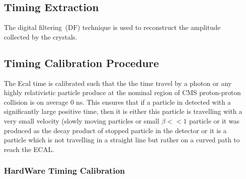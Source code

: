 
\subsection{Timing Extraction}
The digital  filtering~(DF) technique is used to reconstruct the amplitude collected by the \pb crystals.

\subsection{Timing Calibration Procedure}
The Ecal time is calibrated such that the the time travel by a photon or any highly relativistic  particle  produce at the nominal region of CMS proton-proton collision is on average 0 ns. This ensures that if a particle in detected with a significantly large positive time, then it is either this particle is travelling with a very small velocity (slowly moving particles or small $\beta << 1$ particle or it was produced as the decay product of stopped particle in the detector or it is a particle which is not travelling in a straight line but rather on a curved path to reach the ECAL.


\subsubsection{HardWare Timing Calibration}


